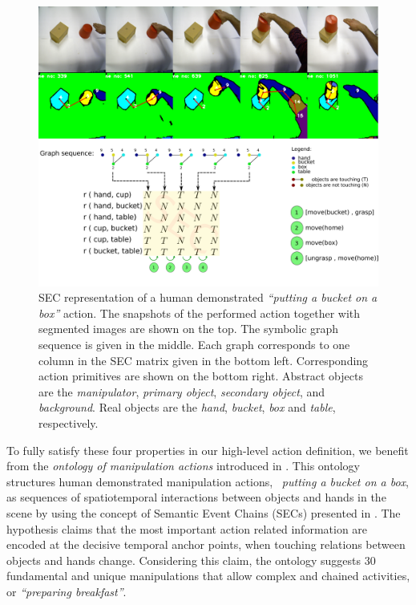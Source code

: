  
\begin{figure}[!hb]
  \centering
    \includegraphics[scale=0.25]{./pdf/action_graph_sec.pdf}
      \caption{ SEC representation of a human demonstrated {\it ``putting a bucket on a box''} action.      
       The snapshots of the performed action together with segmented images are shown on the top. 
       The symbolic graph sequence is given in the middle. Each graph corresponds to one column in the SEC matrix given in the bottom left. Corresponding action primitives are shown on the bottom right.
Abstract objects are the {\it  manipulator}, {\it primary object}, {\it secondary object}, and {\it background}.  Real objects are the {\it hand}, {\it  bucket}, {\it  box} and {\it  table}, respectively.}
      \label{fig:put_on_action}
\end{figure}

 
To fully satisfy these four properties in our high-level action definition, we benefit from the  \textit{ontology of manipulation actions} introduced in \cite{TAMD13}.
This ontology structures human demonstrated manipulation actions, \eg~{\it putting a bucket on a box}, as sequences of spatiotemporal interactions between objects and hands in the scene by using the concept of Semantic Event Chains (SECs) presented in \cite{Aksoy2011}. 
The hypothesis claims that the most important action related information are encoded at the decisive temporal anchor points, \ie when touching relations between objects and hands change. Considering this claim, the ontology suggests $30$ fundamental and unique manipulations that allow complex and chained activities,  or {\it ``preparing breakfast''}.

